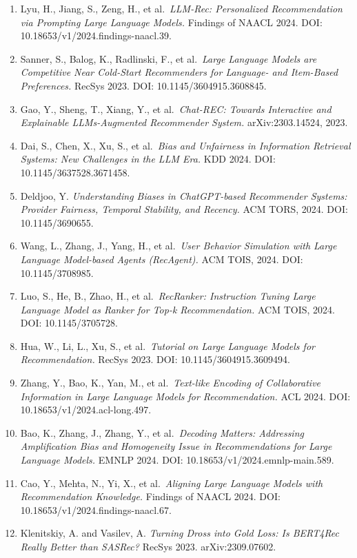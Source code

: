 \begin{enumerate}
\item
  Lyu, H., Jiang, S., Zeng, H., et al.~\emph{LLM-Rec: Personalized Recommendation via Prompting Large Language Models.} Findings of NAACL 2024. DOI: 10.18653/v1/2024.findings-naacl.39.
\item
  Sanner, S., Balog, K., Radlinski, F., et al.~\emph{Large Language Models are Competitive Near Cold-Start Recommenders for Language- and Item-Based Preferences.} RecSys 2023. DOI: 10.1145/3604915.3608845.
\item
  Gao, Y., Sheng, T., Xiang, Y., et al.~\emph{Chat-REC: Towards Interactive and Explainable LLMs-Augmented Recommender System.} arXiv:2303.14524, 2023.
\item
  Dai, S., Chen, X., Xu, S., et al.~\emph{Bias and Unfairness in Information Retrieval Systems: New Challenges in the LLM Era.} KDD 2024. DOI: 10.1145/3637528.3671458.
\item
  Deldjoo, Y. \emph{Understanding Biases in ChatGPT-based Recommender Systems: Provider Fairness, Temporal Stability, and Recency.} ACM TORS, 2024. DOI: 10.1145/3690655.
\item
  Wang, L., Zhang, J., Yang, H., et al.~\emph{User Behavior Simulation with Large Language Model-based Agents (RecAgent).} ACM TOIS, 2024. DOI: 10.1145/3708985.
\item
  Luo, S., He, B., Zhao, H., et al.~\emph{RecRanker: Instruction Tuning Large Language Model as Ranker for Top-k Recommendation.} ACM TOIS, 2024. DOI: 10.1145/3705728.
\item
  Hua, W., Li, L., Xu, S., et al.~\emph{Tutorial on Large Language Models for Recommendation.} RecSys 2023. DOI: 10.1145/3604915.3609494.
\item
  Zhang, Y., Bao, K., Yan, M., et al.~\emph{Text-like Encoding of Collaborative Information in Large Language Models for Recommendation.} ACL 2024. DOI: 10.18653/v1/2024.acl-long.497.
\item
  Bao, K., Zhang, J., Zhang, Y., et al.~\emph{Decoding Matters: Addressing Amplification Bias and Homogeneity Issue in Recommendations for Large Language Models.} EMNLP 2024. DOI: 10.18653/v1/2024.emnlp-main.589.
\item
  Cao, Y., Mehta, N., Yi, X., et al.~\emph{Aligning Large Language Models with Recommendation Knowledge.} Findings of NAACL 2024. DOI: 10.18653/v1/2024.findings-naacl.67.
\item
  Klenitskiy, A. and Vasilev, A. \emph{Turning Dross into Gold Loss: Is BERT4Rec Really Better than SASRec?} RecSys 2023. arXiv:2309.07602.

\end{enumerate}
